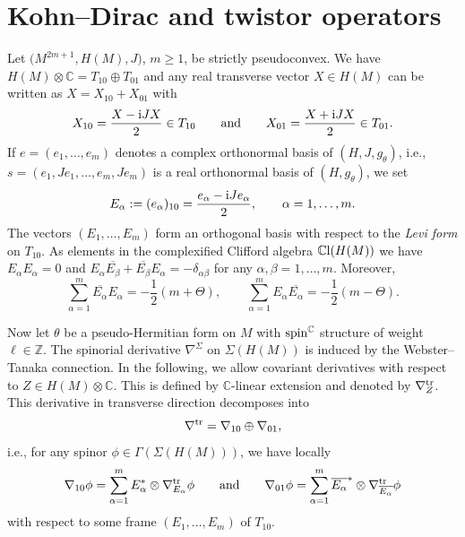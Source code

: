 \documentclass[pdftex]{sigma}
\numberwithin{equation}{section}
\newcommand{\ZZ}{\mathbb{Z}}
\newcommand{\CC}{\mathbb{C}}
\begin{document}
\section{Kohn--Dirac and twistor operators} \label{Sec6}

Let $\big(M^{2m+1},H(M),J\big)$, $m\geq 1$, be strictly pseudoconvex. We have
$H(M)\otimes\CC=T_{10}\oplus T_{01}$ and any real transverse vector $X\in H(M)$ can be written as $X=X_{10}+X_{01}$ with
\[
X_{10}= \frac{X-{\rm i}JX}{2}\in T_{10}\qquad \mbox{and}\qquad X_{01}=\frac{X+{\rm i}JX}{2}\in T_{01}.
\]
If $e=(e_1,\dots,e_m)$ denotes a complex orthonormal basis of $(H,J,g_\theta)$, i.e., $s=(e_1,Je_1,\dots,e_m,\allowbreak Je_m)$ is a real orthonormal basis of $(H,g_\theta)$,
we set \[E_\alpha := (e_\alpha)_{10} = \frac{e_\alpha-{\rm i}Je_\alpha}{2},\qquad\alpha=1,\dots,m.\]
The vectors $(E_1,\dots,E_m)$ form an orthogonal basis with respect to the {\em Levi form} on $T_{10}$.
As elements in the complexified Clifford algebra $\CC{\rm l}(H(M))$ we have $E_\alpha E_\alpha=0$ and $E_\alpha\overline{E_\beta}+\overline{E_\beta}E_\alpha=-\delta_{\alpha\beta}$
for any $\alpha,\beta=1,\dots,m$. Moreover,
\begin{equation*}%
\sum_{\alpha=1}^m \overline{E_\alpha}E_\alpha = -\frac{1}{2}(m+\Theta),\qquad
\sum_{\alpha=1}^m E_\alpha\overline{E_\alpha} = -\frac{1}{2}(m-\Theta).
\end{equation*}

Now let $\theta$ be a pseudo-Hermitian form on $M$ with ${\rm spin}^\CC$ structure of weight $\ell\in\ZZ$.
The spinorial derivative $\nabla^\Sigma$ on $\Sigma(H(M))$ is induced by the Webster--Tanaka connection.
In the following, we allow covariant derivatives with respect to $Z\in H(M)\otimes\CC$.
This is defined by $\CC$-linear extension and denoted by $\nabla^{\rm tr}_Z$.
This derivative in transverse direction decomposes into
\[
\nabla^{\rm tr} = \nabla_{10} \oplus \nabla_{01},
\]
i.e., for any spinor $\phi\in\Gamma(\Sigma(H(M)))$, we have locally
\[
\nabla_{10}\phi = \sum_{\alpha=1}^m E_\alpha^*\otimes \nabla^{\rm tr}_{E_\alpha}\phi\qquad\mbox{and}\qquad
\nabla_{01}\phi = \sum_{\alpha=1}^m \overline{E_\alpha}^*\otimes \nabla^{\rm tr}_{\overline{E_\alpha}}\phi
\]
with respect to some frame $(E_1,\dots,E_m)$ of $T_{10}$.
\end{document}
